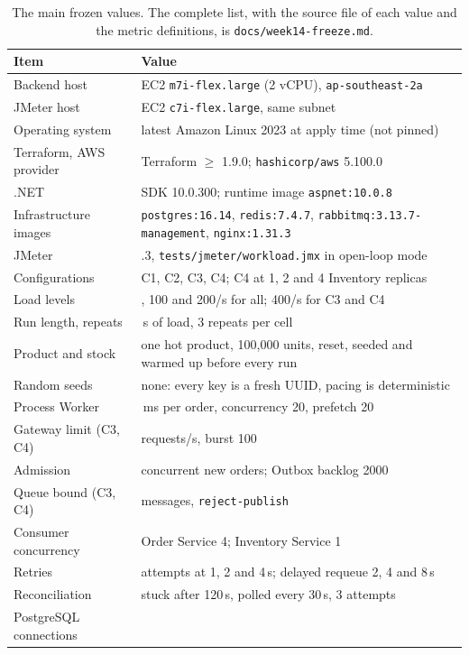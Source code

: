 \documentclass[a4paper]{report}
\begin{document}
\begin{table}[H]
\centering
\footnotesize
\begin{tabular}{@{}>{\raggedright\arraybackslash}p{}>{\raggedright\arraybackslash}p{}@{}}
\toprule
Item & Value \\
\midrule
Backend host & EC2 \texttt{m7i-flex.large} (2 vCPU), \texttt{ap-southeast-2a} \\
JMeter host & EC2 \texttt{c7i-flex.large}, same subnet \\
Operating system & latest Amazon Linux 2023 at apply time (not pinned) \\
Terraform, AWS provider & Terraform \(\geq\) 1.9.0; \texttt{hashicorp/aws} 5.100.0 \\
.NET & SDK 10.0.300; runtime image \texttt{aspnet:10.0.8} \\
Infrastructure images & \texttt{postgres:16.14}, \texttt{redis:7.4.7},
  \texttt{rabbitmq:3.13.7-management}, \texttt{nginx:1.31.3} \\
JMeter & 5.6.3, \nolinkurl{tests/jmeter/workload.jmx} in open-loop mode \\
\midrule
Configurations & C1, C2, C3, C4; C4 at 1, 2 and 4 Inventory replicas \\
Load levels & 50, 100 and 200/s for all; 400/s for C3 and C4 \\
Run length, repeats & 60\,s of load, 3 repeats per cell \\
Product and stock & one hot product, 100,000 units, reset, seeded and warmed
  up before every run \\
Random seeds & none: every key is a fresh UUID, pacing is deterministic \\
\midrule
Process Worker & 200\,ms per order, concurrency 20, prefetch 20 \\
Gateway limit (C3, C4) & 200 requests/s, burst 100 \\
Admission & 64 concurrent new orders; Outbox backlog 2000 \\
Queue bound (C3, C4) & 1000 messages, \texttt{reject-publish} \\
Consumer concurrency & Order Service 4; Inventory Service 1 \\
Retries & 4 attempts at 1, 2 and 4\,s; delayed requeue 2, 4 and 8\,s \\
Reconciliation & stuck after 120\,s, polled every 30\,s, 3 attempts \\
PostgreSQL connections & 200 \\
\bottomrule
\end{tabular}
\caption{The main frozen values. The complete list, with the source file of
each value and the metric definitions, is \nolinkurl{docs/week14-freeze.md}.}
\label{tab:app-freeze}
\end{table}
\end{document}

